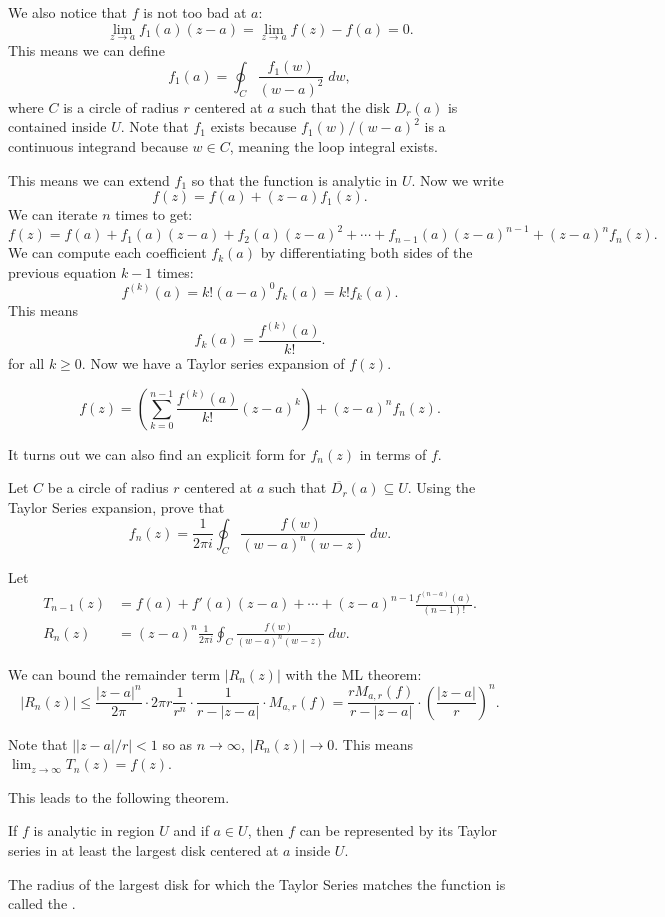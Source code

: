 \documentclass[notes]{subfile}
\begin{document}
We also notice that $f$ is not too bad at $a$:
\[ \lim_{z \to a} f_1(a) (z-a) = \lim_{z\to a} f(z) - f(a) = 0. \]
This means we can define 
\[ f_1(a) = \oint_C \frac{f_1(w)}{(w-a)^2} \; dw, \]
where $C$ is a circle of radius $r$ centered at $a$ such that the
disk $D_r(a)$ is contained inside $U$. 
Note that $f_1$ exists because $f_1(w)/(w-a)^2$ is a continuous
integrand because $w \in C$, meaning the loop integral exists.

This means we can extend $f_1$ so that the function is analytic
in $U$.
Now we write
\[ f(z) = f(a) + (z-a)f_1(z). \]
We can iterate $n$ times to get:
\[ f(z) = f(a) + f_1(a) (z-a) + f_2(a) (z-a)^2 + \cdots +
f_{n-1}(a)(z-a)^{n-1} + (z-a)^nf_n(z). \]
We can compute each coefficient $f_k(a)$ by differentiating both sides of the previous equation $k-1$ times:
\[f^{(k)}(a) = k!(a-a)^0f_k(a) = k!f_k(a). \]
This means
\[ f_k(a) = \frac{f^{(k)}(a)}{k!}.\]
for all $k \ge 0$.  Now we have a Taylor series expansion of $f(z)$.
\begin{theorem}
    \[ f(z) = \left( \sum_{k=0}^{n-1} \frac{f^{(k)}(a)}{k!} (z-a)^k \right) + (z-a)^nf_n(z). \]
\end{theorem}

\noindent
It turns out we can also find an explicit form for $f_n(z)$ in terms
of $f$.

\begin{exercise}
    Let $C$ be a circle of radius $r$ centered at $a$ such that
    $\overline{D_r}(a) \subseteq U$.
    Using the Taylor Series expansion, prove that
    \[ f_n(z) = \frac{1}{2\pi i} \oint_{C} \frac{f(w) \; }{(w-a)^n (w-z)}
    \; dw. \]
\end{exercise}

Let 
\begin{align*}
    T_{n-1}(z) &= f(a) + f'(a)(z-a) + \cdots + (z-a)^{n-1}
    \frac{f^{(n-a)}(a)}{(n-1)!}. \\
    R_n(z) &= (z-a)^n \frac{1}{2\pi i}\oint_C \frac{f(w) \; }{(w-a)^n (w-z)}
    \; dw.
\end{align*}

We can bound the remainder term $|R_n(z)|$ with the ML theorem:
\[ |R_n(z)| \le \frac{|z-a|^n}{2\pi}  
    \cdot 2\pi r \frac{1}{r^n} \cdot \frac{1}{r - |z-a|}
    \cdot M_{a,r}(f) = \frac{r M_{a,r}(f)}{r - |z-a|} \cdot 
\left( \frac{|z-a|}{r} \right)^n. \]

Note that $| |z-a|/r | < 1$ so as $n \to \infty$, $|R_n(z)| \to 0$.
This means $\lim_{z \to \infty} T_{n} (z) = f(z)$.

\noindent
This leads to the following theorem.
\begin{theorem}
    If $f$ is analytic in region $U$ and if $a \in U$, then $f$
    can be represented by its Taylor series in at least the largest
    disk centered at $a$ inside $U$.
\end{theorem}
The radius of the largest disk for which the Taylor Series 
matches the function is called the .
\end{document}
